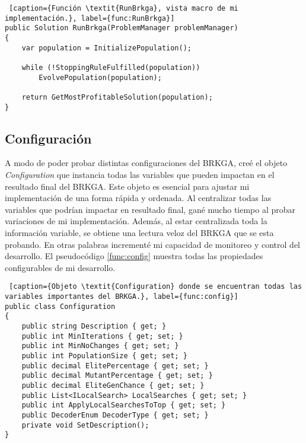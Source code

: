 \bigskip

\begin{minipage}{\linewidth}
\begin{lstlisting} [caption={Función \textit{RunBrkga}, vista macro de mi implementación.}, label={func:RunBrkga}]
public Solution RunBrkga(ProblemManager problemManager)
{
    var population = InitializePopulation();

    while (!StoppingRuleFulfilled(population))
        EvolvePopulation(population);

    return GetMostProfitableSolution(population);
}
\end{lstlisting}
\end{minipage}

\subsection{Configuración} \label{sec:config}

A modo de poder probar distintas configuraciones del BRKGA, creé el objeto \textit{Configuration} que instancia todas las variables que pueden impactan en el resultado final del BRKGA. Este objeto es esencial para ajustar mi implementación de una forma rápida y ordenada. Al centralizar todas las variables que podrían impactar en resultado final, gané mucho tiempo al probar variaciones de mi implementación. Además, al estar centralizada toda la información variable, se obtiene una lectura veloz del BRKGA que se esta probando. En otras palabras incrementé mi capacidad de monitoreo y control del desarrollo. El pseudocódigo \ref{func:config} muestra todas las propiedades configurables de mi desarrollo.

\bigskip

\begin{minipage}{\linewidth}
\begin{lstlisting} [caption={Objeto \textit{Configuration} donde se encuentran todas las variables importantes del BRKGA.}, label={func:config}]
public class Configuration
{
	public string Description { get; }
	public int MinIterations { get; set; }
	public int MinNoChanges { get; set; }
	public int PopulationSize { get; set; }
	public decimal ElitePercentage { get; set; }
	public decimal MutantPercentage { get; set; }
	public decimal EliteGenChance { get; set; }
	public List<ILocalSearch> LocalSearches { get; set; }
	public int ApplyLocalSearchesToTop { get; set; }
	public DecoderEnum DecoderType { get; set; }	
	private void SetDescription();
}
\end{lstlisting}
\end{minipage}

